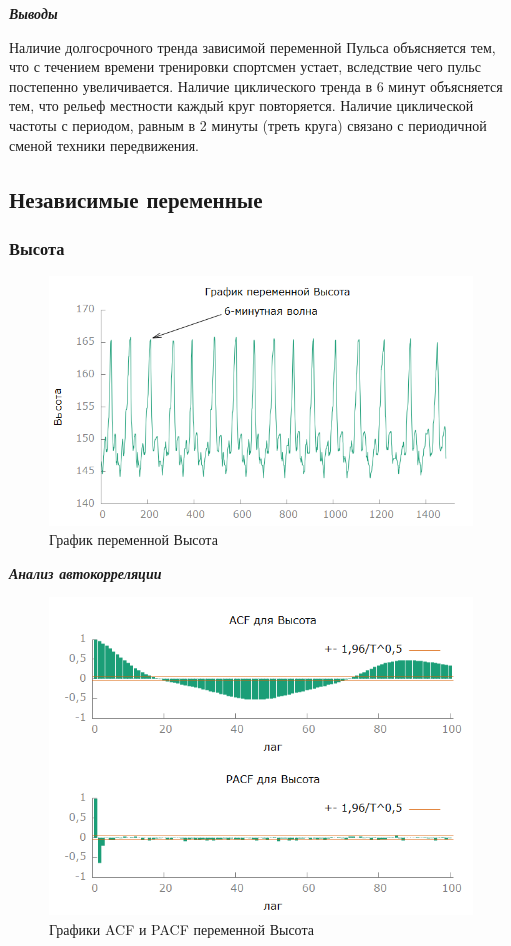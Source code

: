 \documentclass[a4paper,12pt]{article}
\begin{document}

\textbf{\textit{Выводы}}

Наличие долгосрочного тренда зависимой переменной Пульса объясняется тем, что с течением времени тренировки спортсмен устает, вследствие чего пульс постепенно увеличивается. Наличие циклического тренда в 6 минут объясняется тем, что рельеф местности каждый круг повторяется. Наличие циклической частоты с периодом, равным в 2 минуты (треть круга) связано с периодичной сменой техники передвижения. %

\subsection{Независимые переменные}
\subsubsection{Высота}
\begin{figure}[H]
	\centering
	\includegraphics[width=0.5\linewidth]{../[graphics]/ele_graph}
	\caption{График переменной Высота}
	\label{fig:ele_graph}
\end{figure}

\textbf{\textit{Анализ автокорреляции}}

\begin{figure}[H]
	\centering
	\includegraphics[width=0.5\linewidth]{../[graphics]/ele_acf_100}
	\caption{Графики ACF и PACF переменной Высота}
	\label{fig:ele_acf_100}
\end{figure}
\end{document}
